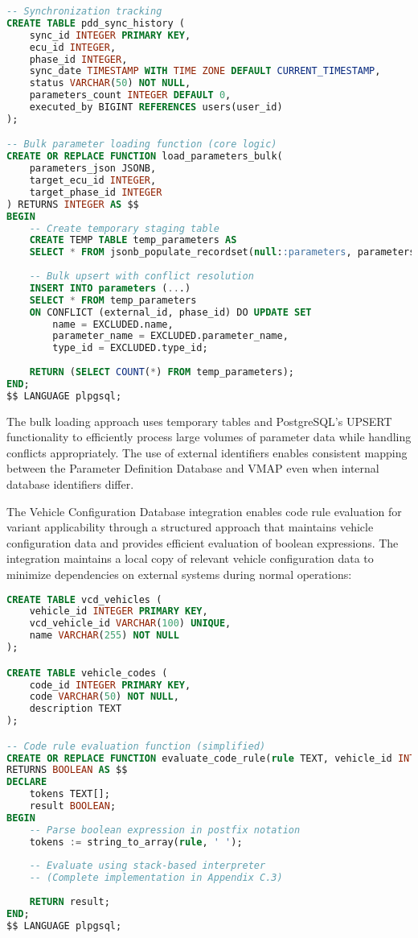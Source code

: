 \begin{lstlisting}[language=SQL, caption={PDD Synchronization Framework}, label={lst:pdd-sync}]
-- Synchronization tracking
CREATE TABLE pdd_sync_history (
    sync_id INTEGER PRIMARY KEY,
    ecu_id INTEGER,
    phase_id INTEGER,
    sync_date TIMESTAMP WITH TIME ZONE DEFAULT CURRENT_TIMESTAMP,
    status VARCHAR(50) NOT NULL,
    parameters_count INTEGER DEFAULT 0,
    executed_by BIGINT REFERENCES users(user_id)
);

-- Bulk parameter loading function (core logic)
CREATE OR REPLACE FUNCTION load_parameters_bulk(
    parameters_json JSONB,
    target_ecu_id INTEGER,
    target_phase_id INTEGER
) RETURNS INTEGER AS $$
BEGIN
    -- Create temporary staging table
    CREATE TEMP TABLE temp_parameters AS 
    SELECT * FROM jsonb_populate_recordset(null::parameters, parameters_json);
    
    -- Bulk upsert with conflict resolution
    INSERT INTO parameters (...) 
    SELECT * FROM temp_parameters
    ON CONFLICT (external_id, phase_id) DO UPDATE SET
        name = EXCLUDED.name,
        parameter_name = EXCLUDED.parameter_name,
        type_id = EXCLUDED.type_id;
    
    RETURN (SELECT COUNT(*) FROM temp_parameters);
END;
$$ LANGUAGE plpgsql;
\end{lstlisting}

The bulk loading approach uses temporary tables and PostgreSQL's UPSERT functionality to efficiently process large volumes of parameter data while handling conflicts appropriately. The use of external identifiers enables consistent mapping between the Parameter Definition Database and VMAP even when internal database identifiers differ.

The Vehicle Configuration Database integration enables code rule evaluation for variant applicability through a structured approach that maintains vehicle configuration data and provides efficient evaluation of boolean expressions. The integration maintains a local copy of relevant vehicle configuration data to minimize dependencies on external systems during normal operations:

\begin{lstlisting}[language=SQL, caption={Vehicle Configuration Structure}, label={lst:vehicle-config}]
CREATE TABLE vcd_vehicles (
    vehicle_id INTEGER PRIMARY KEY,
    vcd_vehicle_id VARCHAR(100) UNIQUE,
    name VARCHAR(255) NOT NULL
);

CREATE TABLE vehicle_codes (
    code_id INTEGER PRIMARY KEY,
    code VARCHAR(50) NOT NULL,
    description TEXT
);

-- Code rule evaluation function (simplified)
CREATE OR REPLACE FUNCTION evaluate_code_rule(rule TEXT, vehicle_id INTEGER)
RETURNS BOOLEAN AS $$
DECLARE
    tokens TEXT[];
    result BOOLEAN;
BEGIN
    -- Parse boolean expression in postfix notation
    tokens := string_to_array(rule, ' ');
    
    -- Evaluate using stack-based interpreter
    -- (Complete implementation in Appendix C.3)
    
    RETURN result;
END;
$$ LANGUAGE plpgsql;
\end{lstlisting}

